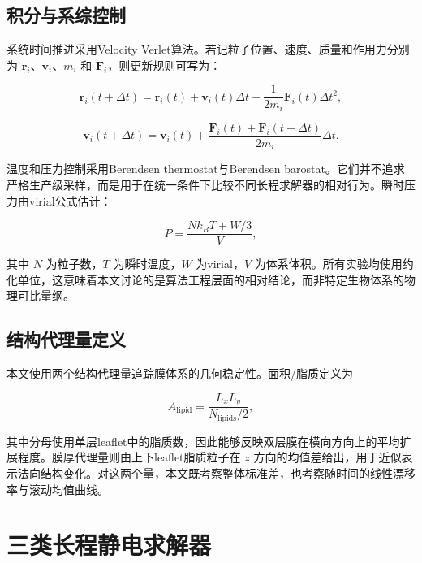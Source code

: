 \subsection{积分与系综控制}

系统时间推进采用Velocity Verlet算法。若记粒子位置、速度、质量和作用力分别为 $\mathbf{r}_i$、$\mathbf{v}_i$、$m_i$ 和 $\mathbf{F}_i$，则更新规则可写为：

\begin{equation}
\mathbf{r}_i(t+\Delta t)=\mathbf{r}_i(t)+\mathbf{v}_i(t)\Delta t+\frac{1}{2m_i}\mathbf{F}_i(t)\Delta t^2,
\label{eq:method_verlet_pos}
\end{equation}

\begin{equation}
\mathbf{v}_i(t+\Delta t)=\mathbf{v}_i(t)+\frac{\mathbf{F}_i(t)+\mathbf{F}_i(t+\Delta t)}{2m_i}\Delta t.
\label{eq:method_verlet_vel}
\end{equation}

温度和压力控制采用Berendsen thermostat与Berendsen barostat。它们并不追求严格生产级采样，而是用于在统一条件下比较不同长程求解器的相对行为。瞬时压力由virial公式估计：

\begin{equation}
P=\frac{Nk_B T + W/3}{V},
\label{eq:method_pressure}
\end{equation}

其中 $N$ 为粒子数，$T$ 为瞬时温度，$W$ 为virial，$V$ 为体系体积。所有实验均使用约化单位，这意味着本文讨论的是算法工程层面的相对结论，而非特定生物体系的物理可比量纲。

\subsection{结构代理量定义}

本文使用两个结构代理量追踪膜体系的几何稳定性。面积/脂质定义为

\begin{equation}
A_{\mathrm{lipid}} = \frac{L_x L_y}{N_{\mathrm{lipids}}/2},
\label{eq:method_apl}
\end{equation}

其中分母使用单层leaflet中的脂质数，因此能够反映双层膜在横向方向上的平均扩展程度。膜厚代理量则由上下leaflet脂质粒子在 $z$ 方向的均值差给出，用于近似表示法向结构变化。对这两个量，本文既考察整体标准差，也考察随时间的线性漂移率与滚动均值曲线。

\section{三类长程静电求解器}

